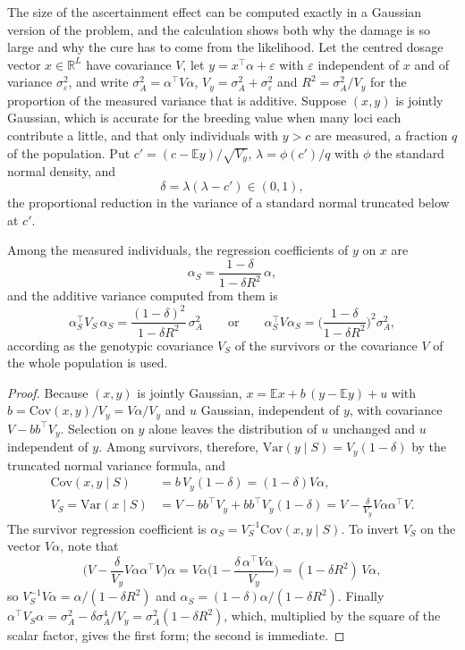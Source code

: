 The size of the ascertainment effect can be computed exactly in a Gaussian version of the problem, and the calculation shows both why the damage is so large and why the cure has to come from the likelihood. Let the centred dosage vector $x \in \mathbb{R}^L$ have covariance $V$, let $y = x^\top\alpha + \varepsilon$ with $\varepsilon$ independent of $x$ and of variance $\sigma^2_\varepsilon$, and write $\sigma^2_A = \alpha^\top V\alpha$, $V_y = \sigma^2_A + \sigma^2_\varepsilon$ and $R^2 = \sigma^2_A/V_y$ for the proportion of the measured variance that is additive. Suppose $(x,y)$ is jointly Gaussian, which is accurate for the breeding value when many loci each contribute a little, and that only individuals with $y > c$ are measured, a fraction $q$ of the population. Put $c' = (c - \mathbb{E}y)/\sqrt{V_y}$, $\lambda = \phi(c')/q$ with $\phi$ the standard normal density, and
\[
\delta = \lambda(\lambda - c') \in (0,1),
\]
the proportional reduction in the variance of a standard normal truncated below at $c'$.

\begin{proposition}
\label{hs:prop:trunc}
Among the measured individuals, the regression coefficients of $y$ on $x$ are
\[
\alpha_S = \frac{1-\delta}{1-\delta R^2}\,\alpha,
\]
and the additive variance computed from them is
\[
\alpha_S^\top V_S\,\alpha_S = \frac{(1-\delta)^2}{1-\delta R^2}\,\sigma^2_A
\qquad\text{or}\qquad
\alpha_S^\top V\alpha_S = \Big(\frac{1-\delta}{1-\delta R^2}\Big)^2\sigma^2_A ,
\]
according as the genotypic covariance $V_S$ of the survivors or the covariance $V$ of the whole population is used.
\end{proposition}

\begin{proof}
Because $(x,y)$ is jointly Gaussian, $x = \mathbb{E}x + b\,(y - \mathbb{E}y) + u$ with $b = \mathrm{Cov}(x,y)/V_y = V\alpha/V_y$ and $u$ Gaussian, independent of $y$, with covariance $V - bb^\top V_y$. Selection on $y$ alone leaves the distribution of $u$ unchanged and $u$ independent of $y$. Among survivors, therefore, $\mathrm{Var}(y\mid S) = V_y(1-\delta)$ by the truncated normal variance formula, and
\begin{align*}
\mathrm{Cov}(x,y\mid S) &= b\,V_y(1-\delta) = (1-\delta)V\alpha,\\
V_S = \mathrm{Var}(x\mid S) &= V - bb^\top V_y + bb^\top V_y(1-\delta) = V - \frac{\delta}{V_y}V\alpha\alpha^\top V .
\end{align*}
The survivor regression coefficient is $\alpha_S = V_S^{-1}\mathrm{Cov}(x,y\mid S)$. To invert $V_S$ on the vector $V\alpha$, note that
\[
\Big(V - \frac{\delta}{V_y}V\alpha\alpha^\top V\Big)\alpha = V\alpha\Big(1 - \frac{\delta\,\alpha^\top V\alpha}{V_y}\Big) = (1-\delta R^2)\,V\alpha ,
\]
so $V_S^{-1}V\alpha = \alpha/(1-\delta R^2)$ and $\alpha_S = (1-\delta)\alpha/(1-\delta R^2)$. Finally $\alpha^\top V_S\alpha = \sigma^2_A - \delta\sigma^4_A/V_y = \sigma^2_A(1-\delta R^2)$, which, multiplied by the square of the scalar factor, gives the first form; the second is immediate.
\end{proof}

